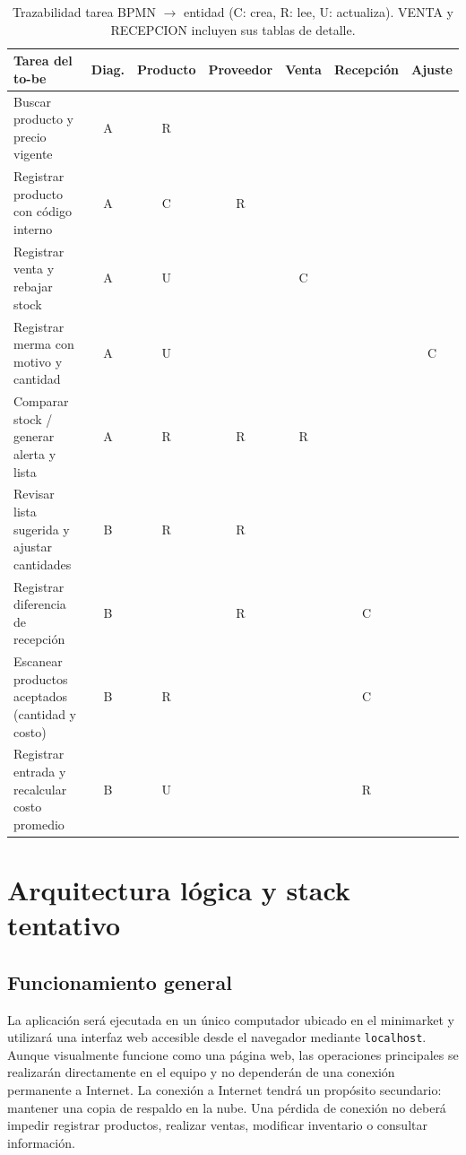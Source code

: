 \documentclass[10pt,a4paper]{article}
\begin{document}
\begin{table}[H]
\centering\footnotesize
\setlength{\tabcolsep}{4pt}
\begin{tabular}{@{}lcccccc@{}}
\toprule
\textbf{Tarea del to-be} & \textbf{Diag.} & \textbf{Producto} & \textbf{Proveedor} & \textbf{Venta} & \textbf{Recepción} & \textbf{Ajuste} \\
\midrule
Buscar producto y precio vigente & A & R & & & & \\
Registrar producto con código interno & A & C & R & & & \\
Registrar venta y rebajar stock & A & U & & C & & \\
Registrar merma con motivo y cantidad & A & U & & & & C \\
Comparar stock / generar alerta y lista & A & R & R & R & & \\
Revisar lista sugerida y ajustar cantidades & B & R & R & & & \\
Registrar diferencia de recepción & B & & R & & C & \\
Escanear productos aceptados (cantidad y costo) & B & R & & & C & \\
Registrar entrada y recalcular costo promedio & B & U & & & R & \\
\bottomrule
\end{tabular}
\caption{Trazabilidad tarea BPMN $\rightarrow$ entidad (C: crea, R: lee, U: actualiza). VENTA y RECEPCION incluyen sus tablas de detalle.}
\label{tab:crud}
\end{table}

\section{Arquitectura lógica y stack tentativo}

\subsection{Funcionamiento general}

La aplicación será ejecutada en un único computador ubicado en el minimarket y utilizará una interfaz web accesible desde el navegador mediante \texttt{localhost}. Aunque visualmente funcione como una página web, las operaciones principales se realizarán directamente en el equipo y no dependerán de una conexión permanente a Internet. La conexión a Internet tendrá un propósito secundario: mantener una copia de respaldo en la nube. Una pérdida de conexión no deberá impedir registrar productos, realizar ventas, modificar inventario o consultar información.
\end{document}
